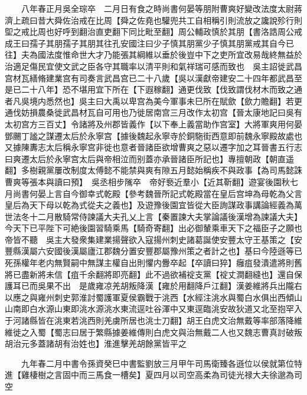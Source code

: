 　　八年春正月吳全琮卒　二月日有食之時尚書何晏等朋附曹爽好變改法度太尉蔣濟上疏曰昔大舜佐治戒在比周【舜之佐堯也驩兜共工自相稱引則流放之讒說殄行則堲之戒比周也好呼到翻治直吏翻下同比毗至翻】周公輔政慎於其朋【書洛誥周公戒成王曰孺子其朋孺子其朋其往孔安國注曰少子慎其朋黨少子慎其朋黨戒其自今已往】夫為國法度惟命世大才乃能張其綱維以垂於後豈中下之吏所宜改易哉終無益於治適足傷民宜使文武之臣各守其職率以清平則和氣祥瑞可感而致也　吳主詔徙武昌宫材瓦繕脩建業宫有司奏言武昌宫已二十八歲【吳以漢獻帝建安二十四年都武昌至是已二十八年】恐不堪用宜下所在【下遐稼翻】通更伐致【伐致謂伐材木而致之通者凡吳境内悉然也】吳主曰大禹以卑宫為美今軍事未巳所在賦歛【歛力贍翻】若更通伐妨損農桑徙武昌材瓦自可用也乃徙居南宫三月改作太初宫【晉太康地記曰吳有太初宫方三百丈】令諸將及州郡皆義作【以下奉上義當助作宫室】大將軍爽用何晏鄧颺丁謐之謀遷太后於永寧宫【據後魏起永寧寺於銅駞街西意即前魏永寧殿故處也又據陳夀志太后稱永寧宫非徙也意者晉諸臣欲增曹爽之惡以遷字加之耳晉書五行志曰爽遷太后於永寧宫太后與帝相泣而别蓋亦承晉諸臣所記也】專擅朝政【朝直遥翻】多樹親黨屢改制度太傅懿不能禁與爽有隙五月懿始稱疾不與政事【為司馬懿誅曹爽等張本與讀曰預】　吳丞相步隲卒　帝好䙝近羣小【近其靳翻】遊宴後園秋七月尚書何晏上言自今御幸式乾殿【參考魏晉所記式乾殿當在皇后宫坤為母乾為父言皇后為天下母以乾為式從夫之義也】及遊豫後園宜皆從大臣詢謀政事講論經義為萬世法冬十二月散騎常侍諫議大夫孔乂上言【秦置諫大夫掌論議後漢增為諫議大夫】今天下已平陛下可絶後園習騎乘馬【騎奇寄翻】出必御輦乘車天下之福臣子之願也帝皆不聽　吳主大發衆集建業揚聲欲入寇揚州刺史諸葛誕使安豐太守王基策之【安豐縣漢屬六安國後漢屬廬江郡魏分置安豐郡屬豫州策之者計之也】基曰今陸遜等已死孫權年老内無賢嗣中無謀主權自出則懼内釁卒起【卒讀曰猝】癰疽發潰遣將則舊將已盡新將未信【疽千余翻將即亮翻】此不過欲補䘺支黨【䘺丈澗翻縫也】還自保護耳已而吳果不出　是歲雍凉羌胡叛降漢【雍於用翻降戶江翻】漢姜維將兵出隴右以應之與雍州刺史郭淮討蜀護軍夏侯霸戰于洮西【水經注洮水與蜀白水俱出西傾山山南即白水源山東即洮水源洮水東流逕吐谷渾中又東逕臨洮安故狄道又北至抱罕入于河諸縣皆在洮東若洮西則羌虜所居也洮士刀翻】胡王白虎文治無戴等率部落降維維徙之入蜀【蜀志曰居于繁縣據姜維傳則白虎文與治無戴二人也又魏志曹真討破叛胡治元多蓋諸胡有治姓也】淮進擊羌胡餘黨皆平之

　　九年春二月中書令孫資癸巳中書監劉放三月甲午司馬衛臻各遜位以侯就第位特進【雞棲樹之言固中而三馬食一槽矣】夏四月以司空高柔為司徒光禄大夫徐邈為司空

